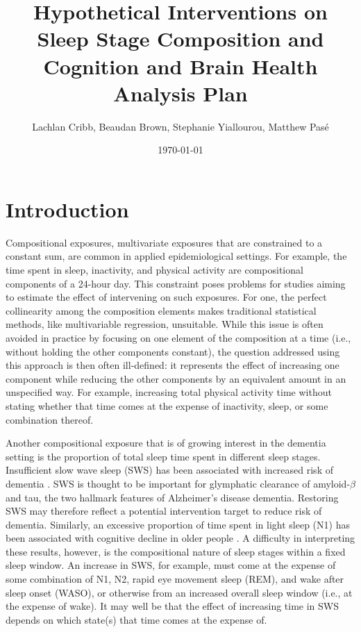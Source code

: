 \documentclass{article}
\title{\textbf{Hypothetical Interventions on Sleep Stage Composition and Cognition and Brain Health} \protect\\ Analysis Plan}
\author{Lachlan Cribb, Beaudan Brown, Stephanie Yiallourou, Matthew Pas\'e}
\date{\today}
\begin{document}
\maketitle

\section{Introduction}
Compositional exposures, multivariate exposures that are constrained to a constant sum, are common in applied epidemiological settings. For example, the time spent in sleep, inactivity, and physical activity are compositional components of a 24-hour day. This constraint poses problems for studies aiming to estimate the effect of intervening on such exposures. For one, the perfect collinearity among the composition elements makes traditional statistical methods, like multivariable regression, unsuitable. While this issue is often avoided in practice by focusing on one element of the composition at a time (i.e., without holding the other components constant), the question addressed using this approach is then often ill-defined: it represents the effect of increasing one component while reducing the other components by an equivalent amount in an unspecified way. For example, increasing total physical activity time without stating whether that time comes at the expense of inactivity, sleep, or some combination thereof.

Another compositional exposure that is of growing interest in the dementia setting is the proportion of total sleep time spent in different sleep stages. Insufficient slow wave sleep (SWS) has been associated with increased risk of dementia \cite{himali_association_2023}. SWS is thought to be important for glymphatic clearance of amyloid-$\beta$ and tau, the two hallmark features of Alzheimer's disease dementia. Restoring SWS may therefore reflect a potential intervention target to reduce risk of dementia. Similarly, an excessive proportion of time spent in light sleep (N1) has been associated with cognitive decline in older people \cite{song_relationships_2015}. A difficulty in interpreting these results, however, is the compositional nature of sleep stages within a fixed sleep window. An increase in SWS, for example, must come at the expense of some combination of N1, N2, rapid eye movement sleep (REM), and wake after sleep onset (WASO), or otherwise from an increased overall sleep window (i.e., at the expense of wake). It may well be that the effect of increasing time in SWS depends on which state(s) that time comes at the expense of.
\end{document}
